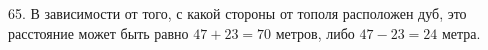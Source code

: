 65. В зависимости от того, с какой стороны от тополя расположен дуб, это расстояние может быть равно $47+23=70$ метров, либо $47-23=24$ метра.\\
